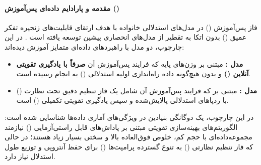 \item {}

\paragraph*{مقدمه و پارادایم داده‌ای پس‌آموزش ()}
فاز پس‌آموزش () در مدل‌های استدلالی خانواده  با هدف ارتقای قابلیت‌های زنجیره تفکر عمیق () بدون اتکا به تقطیر از مدل‌های انحصاری پیشین توسعه یافته است \cite{jaech2024o1, deepseek2025r1}. در این چارچوب، دو مدل با راهبردهای داده‌ای متمایز آموزش دیده‌اند:
\begin{itemize}
    \item \textbf{مدل :} مبتنی بر وزن‌های پایه  \cite{mistral2025medium3} که فرایند پس‌آموزش آن \textbf{صرفاً با یادگیری تقویتی آنلاین ()} و بدون هیچ‌گونه داده راه‌اندازی اولیه استدلالی () به انجام رسیده است.
    \item \textbf{مدل :} مبتنی بر  که فرایند پس‌آموزش آن شامل یک فاز تنظیم دقیق تحت نظارت () با ردپاهای استدلالی پالایش‌شده و سپس یادگیری تقویتی تکمیلی () است.
\end{itemize}

در این چارچوب، یک دوگانگی بنیادین در ویژگی‌های آماری داده‌ها شناسایی شده است: الگوریتم‌های بهینه‌سازی تقویتی مبتنی بر پاداش‌های قابل راستی‌آزمایی () نیازمند مجموعه‌داده‌ای با حجم کم، خلوص فوق‌العاده بالا و سختی بسیار زیاد هستند؛ در حالی که فاز تنظیم نظارتی () به تنوع گسترده پرامپت‌ها () برای حفظ آنتروپی و توزیع طول استدلال نیاز دارد.

